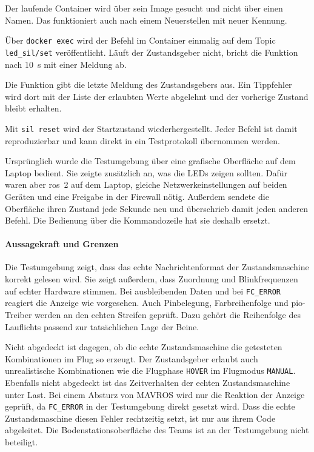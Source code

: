             \begin{description}[style=nextline]
                \item[Container finden] Der laufende Container wird über sein Image gesucht und nicht über einen Namen. Das funktioniert auch nach einem Neuerstellen mit neuer Kennung.
                \item[Befehl übergeben] Über \texttt{docker exec} wird der Befehl im Container einmalig auf dem Topic \texttt{led\_sil/set} veröffentlicht. Läuft der Zustandsgeber nicht, bricht die Funktion nach \SI{10}{\second} mit einer Meldung ab.
                \item[Rückmeldung zeigen] Die Funktion gibt die letzte Meldung des Zustandsgebers aus. Ein Tippfehler wird dort mit der Liste der erlaubten Werte abgelehnt und der vorherige Zustand bleibt erhalten.
            \end{description}

            Mit \texttt{sil reset} wird der Startzustand wiederhergestellt. Jeder Befehl ist damit reproduzierbar und kann direkt in ein Testprotokoll übernommen werden.

            Ursprünglich wurde die Testumgebung über eine grafische Oberfläche auf dem Laptop bedient. Sie zeigte zusätzlich an, was die LEDs zeigen sollten. Dafür waren aber \gls{ros}~2 auf dem Laptop, gleiche Netzwerkeinstellungen auf beiden Geräten und eine Freigabe in der Firewall nötig. Außerdem sendete die Oberfläche ihren Zustand jede Sekunde neu und überschrieb damit jeden anderen Befehl. Die Bedienung über die Kommandozeile hat sie deshalb ersetzt.

            \paragraph{Aussagekraft und Grenzen}
            Die Testumgebung zeigt, dass das echte Nachrichtenformat der Zustandsmaschine korrekt gelesen wird. Sie zeigt außerdem, dass Zuordnung und Blinkfrequenzen auf echter Hardware stimmen. Bei ausbleibenden Daten und bei \texttt{FC\_ERROR} reagiert die Anzeige wie vorgesehen. Auch Pinbelegung, Farbreihenfolge und \gls{pio}-Treiber werden an den echten Streifen geprüft. Dazu gehört die Reihenfolge des Lauflichts passend zur tatsächlichen Lage der Beine.

            Nicht abgedeckt ist dagegen, ob die echte Zustandsmaschine die getesteten Kombinationen im Flug so erzeugt. Der Zustandsgeber erlaubt auch unrealistische Kombinationen wie die Flugphase \texttt{HOVER} im Flugmodus \texttt{MANUAL}. Ebenfalls nicht abgedeckt ist das Zeitverhalten der echten Zustandsmaschine unter Last. Bei einem Absturz von MAVROS wird nur die Reaktion der Anzeige geprüft, da \texttt{FC\_ERROR} in der Testumgebung direkt gesetzt wird. Dass die echte Zustandsmaschine diesen Fehler rechtzeitig setzt, ist nur aus ihrem Code abgeleitet. Die Bodenstationsoberfläche des Teams ist an der Testumgebung nicht beteiligt.

